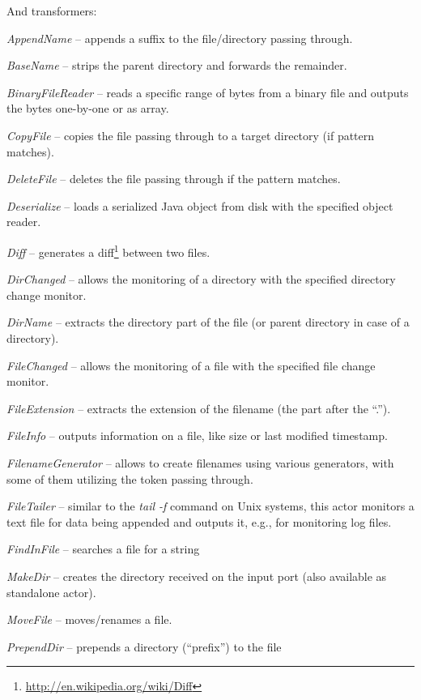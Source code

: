 And transformers:
\begin{tight_itemize}
	\item \textit{AppendName} -- appends a suffix to the file/directory passing
	through.
	\item \textit{BaseName} -- strips the parent directory and forwards the
	remainder.
	\item \textit{BinaryFileReader} -- reads a specific range of bytes from
	a binary file and outputs the bytes one-by-one or as array.
	\item \textit{CopyFile} -- copies the file passing through to a target
	directory (if pattern matches).
	\item \textit{DeleteFile} -- deletes the file passing through if the pattern
	matches.
	\item \textit{Deserialize} -- loads a serialized Java object from disk with
	the specified object reader.
	\item \textit{Diff} -- generates a diff\footnote{\url{http://en.wikipedia.org/wiki/Diff}{}}
	between two files.
	\item \textit{DirChanged} -- allows the monitoring of a directory with
	the specified directory change monitor.
	\item \textit{DirName} -- extracts the directory part of the file (or parent
	directory in case of a directory).
	\item \textit{FileChanged} -- allows the monitoring of a file with
	the specified file change monitor.
	\item \textit{FileExtension} -- extracts the extension of the filename (the
	part after the ``.'').
	\item \textit{FileInfo} -- outputs information on a file, like size or last
	modified timestamp.
	\item \textit{FilenameGenerator} -- allows to create filenames using various
	generators, with some of them utilizing the token passing through.
	\item \textit{FileTailer} -- similar to the \textit{tail -f} command on
	Unix systems, this actor monitors a text file for data being appended and
	outputs it, e.g., for monitoring log files.
	\item \textit{FindInFile} -- searches a file for a string
	\item \textit{MakeDir} -- creates the directory received on the input port
	(also available as standalone actor).
	\item \textit{MoveFile} -- moves/renames a file.
	\item \textit{PrependDir} -- prepends a directory (``prefix'') to the file

\end{tight_itemize}
